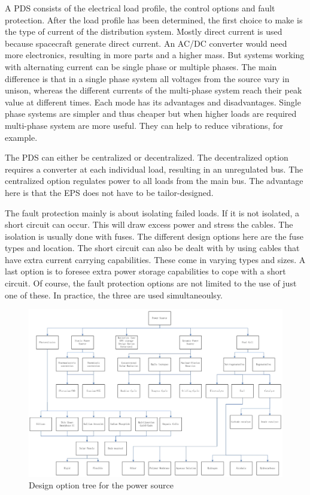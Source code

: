 A \ac{PDS} consists of the electrical load profile, the control options and fault protection.
After the load profile has been determined, the first choice to make is the type of current of the distribution system. Mostly direct current is used because spacecraft generate direct current. An AC/DC converter would need more electronics, resulting in more parts and a higher mass. 
But systems working with alternating current can be single phase or multiple phases\cite{kuphaldt}. The main difference is that in a single phase system all voltages from the source vary in unison, whereas the different currents of the multi-phase system reach their peak value at different times. Each mode has its advantages and disadvantages. Single phase systems are simpler and thus cheaper but when higher loads are required multi-phase system are more useful. They can help to reduce vibrations, for example.

The PDS can either be centralized or decentralized. The decentralized option requires a converter at each individual load, resulting in an unregulated bus. The centralized option regulates power to all loads from the main bus. The advantage here is that the EPS does not have to be tailor-designed. 

The fault protection mainly is about isolating failed loads. If it is not isolated, a short circuit can occur. This will draw excess power and stress the cables. The isolation is usually done with fuses. The different design options here are the fuse types and location.
The short circuit can also be dealt with by using cables that have extra current carrying capabilities. These come in varying types and sizes.
A last option is to foresee extra power storage capabilities to cope with a short circuit.
Of course, the fault protection options are not limited to the use of just one of these. In practice, the three are used simultaneoulsy.

\begin{figure}
\centering
\includegraphics[width=1.0\textwidth, angle=90]{chapters/img/DOTeps_source.jpg}
\caption{Design option tree for the power source}
\label{pic_DOTeps_source}
\end{figure}

